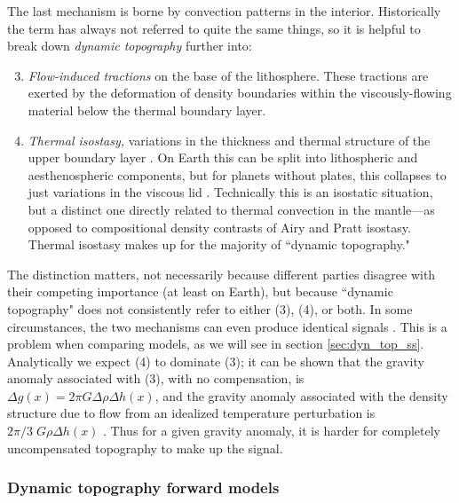 The last mechanism is borne by convection patterns in the interior. Historically the term has always not referred to quite the same things, so it is helpful to break down \emph{dynamic topography} further \citep{Orth2011, Molnar2015, Hoggard2020} into:
\begin{enumerate}
\setcounter{enumi}{2}
\item \emph{Flow-induced tractions} on the base of the lithosphere. These tractions are exerted by the deformation of density boundaries within the viscously-flowing material below the thermal boundary layer.
\item \emph{Thermal isostasy,} variations in the thickness and thermal structure of the upper boundary layer \citep{Fowler1985}. On Earth this can be split into lithospheric and aesthenospheric components, but for planets without plates, this collapses to just variations in the viscous lid \citep[see][]{Orth2011}. Technically this is an isostatic situation, but a distinct one directly related to thermal convection in the mantle---as opposed to compositional density contrasts of Airy and Pratt isostasy. Thermal isostasy makes up for the majority of ``dynamic topography."
\end{enumerate}
The distinction matters, not necessarily because different parties disagree with their competing importance (at least on Earth), but because ``dynamic topography" does not consistently refer to either (3), (4), or both. In some circumstances, the two mechanisms can even produce identical signals \citep{Molnar2015}. This is a problem when comparing models, as we will see in section \ref{sec:dyn_top_ss}. Analytically we expect (4) to dominate (3); it can be shown that the gravity anomaly associated with (3), with no compensation, is $\Delta g(x) = 2\pi G \Delta \rho \Delta h(x)$, and the gravity anomaly associated with the density structure due to flow from an idealized temperature perturbation is $2\pi/3 \; G\rho\Delta h(x)$ \citep{McKenzie1977}. Thus for a given gravity anomaly, it is harder for completely uncompensated topography to make up the signal. 


\subsubsection{Dynamic topography forward models}


